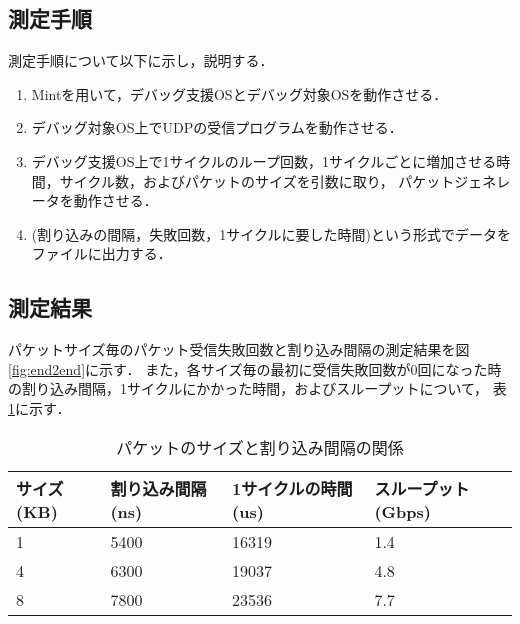 \documentclass[12pt]{jsarticle}
\begin{document}
\subsection{測定手順}
測定手順について以下に示し，説明する．
\begin{enumerate}
    \item Mintを用いて，デバッグ支援OSとデバッグ対象OSを動作させる．
    \item デバッグ対象OS上でUDPの受信プログラムを動作させる．
    \item デバッグ支援OS上で1サイクルのループ回数，1サイクルごとに増加させる時間，サイクル数，およびパケットのサイズを引数に取り，
        パケットジェネレータを動作させる．
    \item (割り込みの間隔，失敗回数，1サイクルに要した時間)という形式でデータをファイルに出力する．
\end{enumerate}

\subsection{測定結果}
パケットサイズ毎のパケット受信失敗回数と割り込み間隔の測定結果を図\ref{fig:end2end}に示す．
また，各サイズ毎の最初に受信失敗回数が0回になった時の割り込み間隔，1サイクルにかかった時間，およびスループットについて，
表\ref{result}に示す．
\begin{table}[htbp]
    \caption{パケットのサイズと割り込み間隔の関係}
    \label{result}
    \begin{center}
        \begin{tabular}{l|l|l|l}   \hline \hline 
            サイズ(KB)  & 割り込み間隔(ns)  & 1サイクルの時間(us)  & スループット(Gbps) \\ \hline
            1           & 5400              & 16319                & 1.4                \\ 
            4           & 6300              & 19037                & 4.8                \\ 
            8           & 7800              & 23536                & 7.7                \\ \hline
        \end{tabular}
    \end{center}
\end{table}
\end{document}
